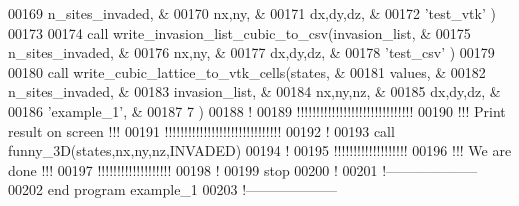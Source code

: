 \begin{DoxyCode}
00169                                       n\_sites\_invaded, &
00170                                       nx,ny,           &
00171                                       dx,dy,dz,        &
00172                                       \textcolor{stringliteral}{'test\_vtk'}   )    
00173 
00174 call write\_invasion\_list\_cubic\_to\_csv(invasion\_list,   &
00175                                       n\_sites\_invaded, &
00176                                       nx,ny,           &
00177                                       dx,dy,dz,        &
00178                                       \textcolor{stringliteral}{'test\_csv'}       )
00179 
00180 call write\_cubic\_lattice\_to\_vtk\_cells(states,          &
00181                                       values,          &
00182                                       n\_sites\_invaded, &
00183                                       invasion\_list,   &
00184                                       nx,ny,nz,        &
00185                                       dx,dy,dz,        &
00186                                       \textcolor{stringliteral}{'example\_1'},     &
00187                                       7                )
00188 \textcolor{comment}{!}
00189 \textcolor{comment}{!!!!!!!!!!!!!!!!!!!!!!!!!!!!!!}
00190 \textcolor{comment}{!!! Print result on screen !!!}
00191 \textcolor{comment}{!!!!!!!!!!!!!!!!!!!!!!!!!!!!!!}
00192 \textcolor{comment}{!}
00193 call funny\_3D(states,nx,ny,nz,INVADED)
00194 \textcolor{comment}{!}
00195 \textcolor{comment}{!!!!!!!!!!!!!!!!!!!}
00196 \textcolor{comment}{!!! We are done !!!}
00197 \textcolor{comment}{!!!!!!!!!!!!!!!!!!!}
00198 \textcolor{comment}{!}
00199 stop
00200 \textcolor{comment}{!}
00201 \textcolor{comment}{!--------------------}
00202 \textcolor{keyword}{end program example\_1}
00203 \textcolor{comment}{!--------------------}
\end{DoxyCode}
